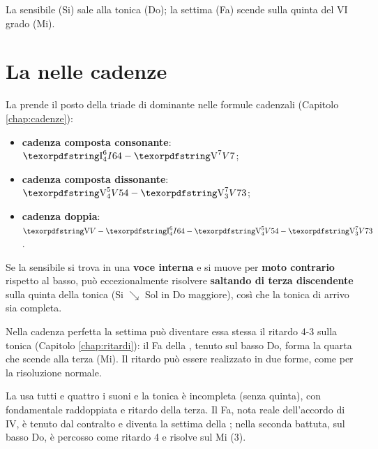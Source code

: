 \begin{esempio}
	\label{ex:v7_inganno}
	La sensibile (Si) sale alla tonica (Do); la settima (Fa) scende sulla quinta del VI grado (Mi).
\end{esempio}

\section{La  nelle cadenze}
\label{sec:v7_cadenze}

La  prende il posto della triade di dominante nelle formule cadenzali (Capitolo \ref{chap:cadenze}):

\begin{itemize}
	\item \textbf{cadenza composta consonante}: $\sigla{I}{6}{4} - \sigla{V}{7}{}$;
	\item \textbf{cadenza composta dissonante}: $\sigla{V}{5}{4} - \sigla{V}{7}{3}$;
	\item \textbf{cadenza doppia}: $\sigla{V}{}{} - \sigla{I}{6}{4} - \sigla{V}{5}{4} - \sigla{V}{7}{3}$.
\end{itemize}

\begin{osservazione}
	\label{oss:eccezione_bach}
	Se la sensibile si trova in una \textbf{voce interna} e si muove per \textbf{moto contrario} rispetto al basso, può eccezionalmente risolvere \textbf{saltando di terza discendente} sulla quinta della tonica (Si $\searrow$ Sol in Do maggiore), così che la tonica di arrivo sia completa.
\end{osservazione}

Nella cadenza perfetta la settima può diventare essa stessa il ritardo 4-3 sulla tonica (Capitolo \ref{chap:ritardi}): il Fa della , tenuto sul basso Do, forma la quarta che scende alla terza (Mi). Il ritardo può essere realizzato in due forme, come per la risoluzione normale.

\begin{esempio}
	\label{ex:ritardo_completo_maggiore}
	La  usa tutti e quattro i suoni e la tonica è incompleta (senza quinta), con fondamentale raddoppiata e ritardo della terza. Il Fa, nota reale dell'accordo di IV, è tenuto dal contralto e diventa la settima della ; nella seconda battuta, sul basso Do, è percosso come ritardo 4 e risolve sul Mi (3).
\end{esempio}

